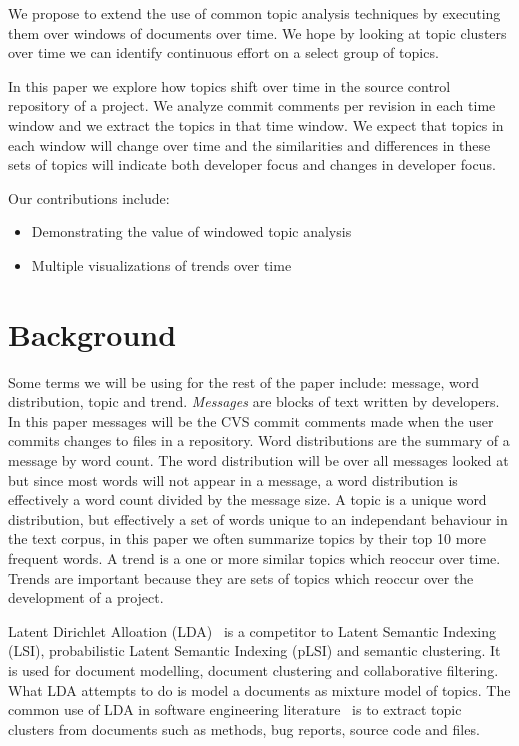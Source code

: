 \documentclass[times, 10pt,twocolumn]{article}
\begin{document}
We propose to extend the use of common topic analysis techniques by executing
them over windows of documents over time. We hope by looking at topic
clusters over time we can identify continuous effort on a select
group of topics.


In this paper we explore how topics shift over time in the
source control repository of a project. We analyze commit comments per
revision in each time window and we extract the topics in that time
window. We expect that topics in each window will change over time and
the similarities and differences in these sets of topics will indicate
both developer focus and changes in developer focus.

Our contributions include:
\begin{itemize}
\item Demonstrating the value of windowed topic analysis
\item Multiple visualizations of trends over time
\end{itemize}


\section{Background}


Some terms we will be using for the rest of the paper include:
message, word distribution, topic and trend. \emph{Messages} are
blocks of text written by developers. In this paper messages will be
the CVS commit comments made when the user commits changes to files in
a repository. Word distributions are the summary of a message by word
count. The word distribution will be over all messages
looked at but since most words will not appear in a message, a word
distribution is effectively a word count divided by the message
size. A topic is a unique word distribution, but effectively a set of
words unique to an independant behaviour in the text corpus, in this
paper we often summarize topics by their top 10 more frequent words.
A trend is a one or more similar topics which reoccur over
time. Trends are important because they are sets of topics which
reoccur over the development of a project.




Latent Dirichlet Alloation (LDA)~\cite{944937} is a competitor to
Latent Semantic Indexing (LSI), probabilistic Latent Semantic Indexing
(pLSI) and semantic clustering. It is used for document modelling,
document clustering and collaborative filtering. What LDA attempts to
do is model a documents as mixture model of topics.  The common use of
LDA in software engineering
literature~\cite{lukins2008,10.1109/MSR.2007.20,NIPS2007637,1321709}
is to extract topic clusters from documents such as methods, bug
reports, source code and files.
\end{document}
